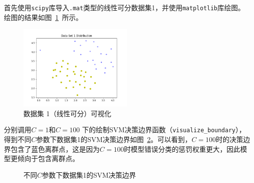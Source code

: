 \documentclass{SEU-AI-Report}
\begin{document}



首先使用\texttt{scipy}库导入\texttt{.mat}类型的线性可分数据集1，并使用\texttt{matplotlib}库绘图。绘图的结果如图~\ref{fig:dataset1}~所示。

\begin{figure}[htbp]
    \centering
    \includegraphics[width=0.5\textwidth]{figure/fig1.png}
    \caption{数据集 1（线性可分）可视化}
    \label{fig:dataset1}
\end{figure}

分别调用$C = 1$和$C = 100$ 下的绘制SVM决策边界函数（\texttt{visualize\_boundary}），得到不同$C$参数下数据集1的SVM决策边界如图~\ref{fig:result1}。可以看到，$C=100$时的决策边界包含了蓝色离群点，这是因为$C=100$时模型错误分类的惩罚权重更大，因此模型更倾向于包含离群点。
\begin{figure}[htbp]
    \centering
    \hfill
    \caption{不同$C$参数下数据集1的SVM决策边界}
    \label{fig:result1}
\end{figure}
\end{document}
